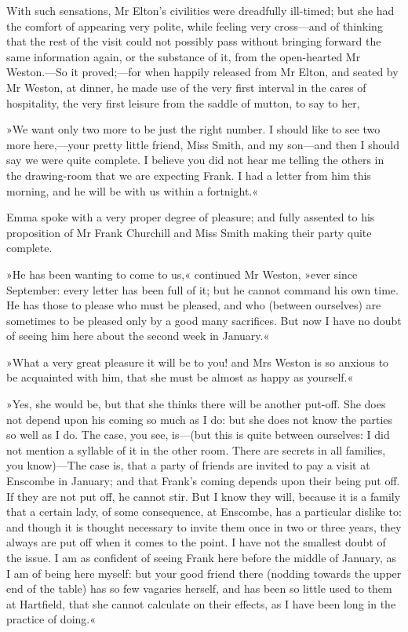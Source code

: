 With such sensations, Mr Elton's civilities were dreadfully ill-timed; but she had the comfort of appearing very polite, while feeling very cross—and of thinking that the rest of the visit could not possibly pass without bringing forward the same information again, or the substance of it, from the open-hearted Mr Weston.—So it proved;—for when happily released from Mr Elton, and seated by Mr Weston, at dinner, he made use of the very first interval in the cares of hospitality, the very first leisure from the saddle of mutton, to say to her,

»We want only two more to be just the right number. I should like to see two more here,—your pretty little friend, Miss Smith, and my son—and then I should say we were quite complete. I believe you did not hear me telling the others in the drawing-room that we are expecting Frank. I had a letter from him this morning, and he will be with us within a fortnight.«

Emma spoke with a very proper degree of pleasure; and fully assented to his proposition of Mr Frank Churchill and Miss Smith making their party quite complete.

»He has been wanting to come to us,« continued Mr Weston, »ever since September: every letter has been full of it; but he cannot command his own time. He has those to please who must be pleased, and who (between ourselves) are sometimes to be pleased only by a good many sacrifices. But now I have no doubt of seeing him here about the second week in January.«

»What a very great pleasure it will be to you! and Mrs Weston is so anxious to be acquainted with him, that she must be almost as happy as yourself.«

»Yes, she would be, but that she thinks there will be another put-off. She does not depend upon his coming so much as I do: but she does not know the parties so well as I do. The case, you see, is—(but this is quite between ourselves: I did not mention a syllable of it in the other room. There are secrets in all families, you know)—The case is, that a party of friends are invited to pay a visit at Enscombe in January; and that Frank's coming depends upon their being put off. If they are not put off, he cannot stir. But I know they will, because it is a family that a certain lady, of some consequence, at Enscombe, has a particular dislike to: and though it is thought necessary to invite them once in two or three years, they always are put off when it comes to the point. I have not the smallest doubt of the issue. I am as confident of seeing Frank here before the middle of January, as I am of being here myself: but your good friend there (nodding towards the upper end of the table) has so few vagaries herself, and has been so little used to them at Hartfield, that she cannot calculate on their effects, as I have been long in the practice of doing.«

